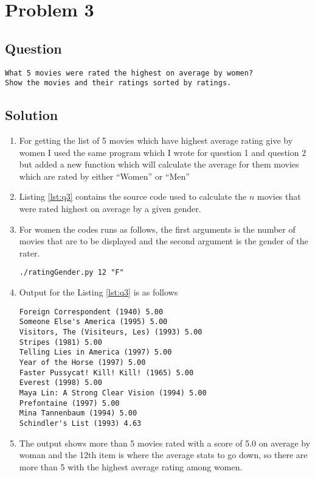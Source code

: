 \section{Problem 3}
\label{part3}
\subsection*{Question}
\begingroup
\begin{verbatim}
What 5 movies were rated the highest on average by women?
Show the movies and their ratings sorted by ratings.
\end{verbatim}

\subsection{Solution}
\begin{enumerate}
\item For getting the list of 5 movies which have highest average rating give by women I used the same program which I wrote for question 1 and question 2 but added a new function which will calculate the average for them movies which are rated by either ``Women'' or ``Men'' 
\item Listing \ref{lst:q3} contains the source code used to calculate the $n$ movies that were rated highest on average by a given gender.
\item For women the codes runs as follows, the first arguments is the number of movies that are to be displayed and the second argument is the gender of the rater.
\begin{lstlisting}[frame=single]
 ./ratingGender.py 12 "F"
\end{lstlisting}
\item Output for the Listing \ref{lst:q3} is as follows 
\begin{lstlisting}[frame=single]
Foreign Correspondent (1940) 5.00
Someone Else's America (1995) 5.00
Visitors, The (Visiteurs, Les) (1993) 5.00
Stripes (1981) 5.00
Telling Lies in America (1997) 5.00
Year of the Horse (1997) 5.00
Faster Pussycat! Kill! Kill! (1965) 5.00
Everest (1998) 5.00
Maya Lin: A Strong Clear Vision (1994) 5.00
Prefontaine (1997) 5.00
Mina Tannenbaum (1994) 5.00
Schindler's List (1993) 4.63
\end{lstlisting}
\item The output shows more than 5 movies rated with a score of 5.0 on average by woman and the 12th item is where the average stats to go down, so there are more than 5 with the highest average rating among women.
\end{enumerate}
\newpage

\newpage
